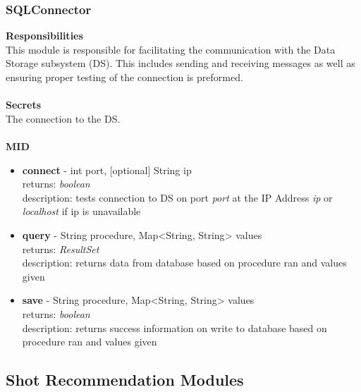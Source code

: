 \documentclass[11pt]{article}
\begin{document}
\subsubsection*{SQLConnector}
\textbf{Responsibilities} \\
This module is responsible for facilitating the communication with the Data Storage subsystem (DS). This includes sending and receiving messages as well as ensuring proper testing of the connection is preformed. \\ \\
\textbf{Secrets} \\
The connection to the DS. \\ \\
\textbf{MID}
\begin{itemize}
\item \textbf{connect} - int port, [optional] String ip \\ returns: \textit{boolean} \\ description: tests connection to DS on port \textit{port} at the IP Address \textit{ip} or \textit{localhost} if ip is unavailable
\item \textbf{query} - String procedure, Map<String, String> values \\ returns: \textit{ResultSet} \\ description: returns data from database based on procedure ran and values given
\item \textbf{save} - String procedure, Map<String, String> values \\ returns: \textit{boolean} \\ description: returns success information on write to database based on procedure ran and values given
\end{itemize}

\subsection{Shot Recommendation Modules} %
\end{document}
